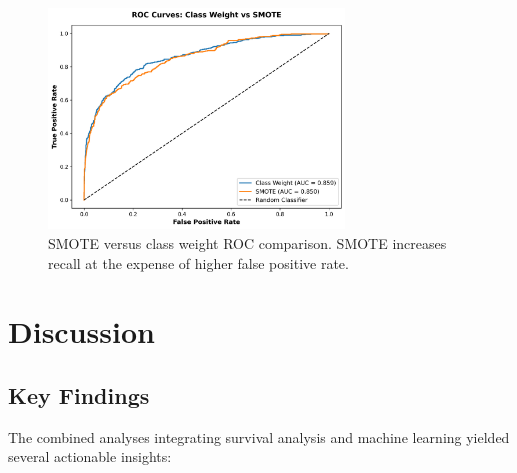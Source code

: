 \documentclass[12pt]{article}
\begin{document}
\begin{figure}[H]
\centering
\includegraphics[width=0.7\textwidth]{../img/25_smote_roc_comparison.png}
\caption{SMOTE versus class weight ROC comparison. SMOTE increases recall at the expense of higher false positive rate.}
\label{fig:smote_roc}
\end{figure}

\section{Discussion}
\subsection{Key Findings}
The combined analyses integrating survival analysis and machine learning yielded several actionable insights:
\end{document}

